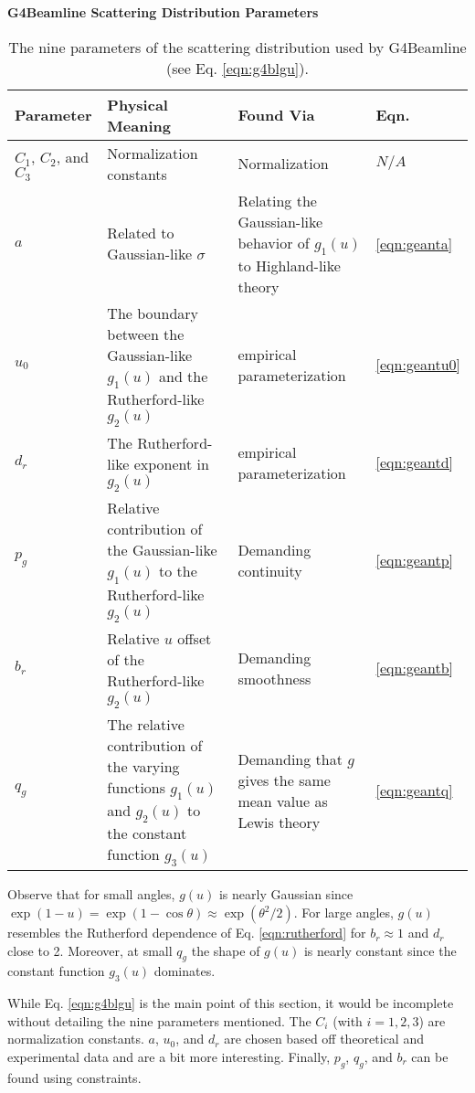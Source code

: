 \begin{table}
\caption*{\textbf{G4Beamline Scattering Distribution Parameters}}
\begin{tabularx}{\textwidth}{| A | B | B | C |}
\hline \hline
	\textbf{Parameter} & \textbf{Physical Meaning} & \textbf{Found Via} & \textbf{Eqn.} \\ \hline
	$C_1$, $C_2$, and $C_3$ & Normalization constants & Normalization & $N/A$ \\ \hline
	$a$ & Related to Gaussian-like $\sigma$ & Relating the Gaussian-like behavior of $g_1(u)$ to Highland-like theory \cite{highland} & \ref{eqn:geanta} \\ \hline
	$u_0$ & The boundary between the Gaussian-like $g_1(u)$ and the Rutherford-like $g_2(u)$ & empirical parameterization & \ref{eqn:geantu0} \\ \hline
	$d_r$ & The Rutherford-like exponent in $g_2(u)$ & empirical parameterization & \ref{eqn:geantd} \\ \hline
	$p_g$ & Relative contribution of the Gaussian-like $g_1(u)$ to the Rutherford-like $g_2(u)$ & Demanding continuity & \ref{eqn:geantp} \\ \hline
	$b_r$ & Relative $u$ offset of the Rutherford-like $g_2(u)$ & Demanding smoothness & \ref{eqn:geantb} \\ \hline
	$q_g$ & The relative contribution of the varying functions $g_1(u)$ and $g_2(u)$ to the constant function $g_3(u)$ & Demanding that $g$ gives the same mean value as Lewis theory & \ref{eqn:geantq}\\
\hline
\end{tabularx}
\caption[G4Beamline scattering distribution parameters.]{The nine parameters of the scattering distribution used by G4Beamline (see Eq. \eqref{eqn:g4blgu}).}
\label{tbl:g4blgu_parameters}
\end{table}


Observe that for small angles, $g(u)$ is nearly Gaussian since $\exp{(1-u)}=\exp{(1-\cos\theta)}\approx\exp{(\theta^2/2)}$. For large angles, $g(u)$ resembles the Rutherford dependence of Eq. \eqref{eqn:rutherford} for $b_r\approx 1$ and $d_r$ close to 2. Moreover, at small $q_g$ the shape of $g(u)$ is nearly constant since the constant function $g_3(u)$ dominates.

While Eq. \eqref{eqn:g4blgu} is the main point of this section, it would be incomplete without detailing the nine parameters mentioned. The $C_i$ (with $i=1,2,3$) are normalization constants. $a$, $u_0$, and $d_r$ are chosen based off theoretical and experimental data and are a bit more interesting. Finally, $p_g$, $q_g$, and $b_r$ can be found using constraints. 

